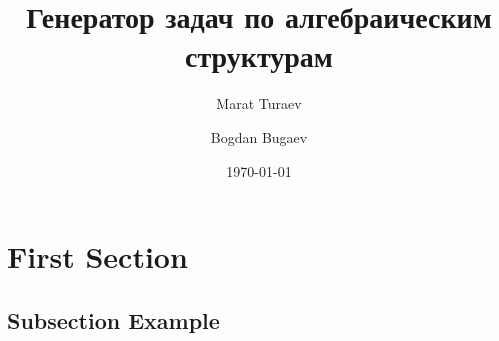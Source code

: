 \documentclass[10pt, pdf,utf8,russian]{beamer}
\title[Генератор задач]{Генератор задач по алгебраическим структурам} %
\author{
	Marat Turaev
	\and
	Bogdan Bugaev
}
\institute[SPbAU] %
{
St Petersburg Academic University \\ %
}
\date{\today} %
\begin{document}
\begin{frame}
\titlepage %
\end{frame}



\section{First Section} %

\subsection{Subsection Example} %
\end{document}
